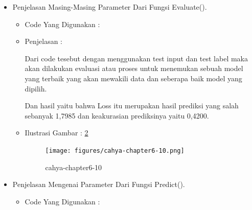 \begin{enumerate}
\begin{itemize}
\begin{itemize}
\par
\item Ilustrasi Gambar : \ref{cahya-chapter6-9}
\par
\begin{figure}[!hbtp]
\centering
\texttt{[image: figures/cahya-chapter6-9.png]}
\caption{cahya-chapter6-9}
\label{cahya-chapter6-9}
\end{figure}
\par
\end{itemize}
\par
\par
\par
\par
\item Penjelasan Masing-Masing Parameter Dari Fungsi Evaluate().
\begin{itemize}
\item Code Yang Digunakan :
\par

\par
\item Penjelasan :
\par Dari code tesebut dengan menggunakan test input dan test label maka akan dilakukan evaluasi atau proses untuk menemukan sebuah model yang terbaik yang akan mewakili data dan seberapa baik model yang dipilih.
\par Dan hasil yaitu bahwa Loss itu merupakan hasil prediksi yang salah sebanyak 1,7985 dan keakurasian prediksinya yaitu 0,4200.
\par
\par
\item Ilustrasi Gambar : \ref{cahya-chapter6-10}
\par
\begin{figure}[!hbtp]
\centering
\texttt{[image: figures/cahya-chapter6-10.png]}
\caption{cahya-chapter6-10}
\label{cahya-chapter6-10}
\end{figure}
\par
\par
\par
\par
\par
\end{itemize}
\item Penjelasan Mengenai Parameter Dari Fungsi Predict().
\begin{itemize}
\item Code Yang Digunakan :
\par


\end{itemize}
\end{itemize}
\end{enumerate}

